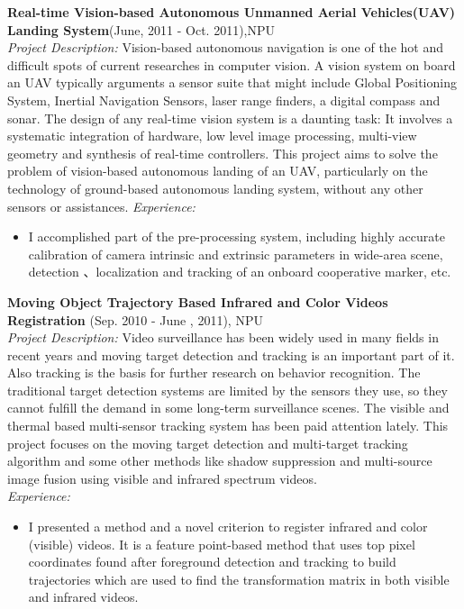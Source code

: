 \documentclass[margin]{res}
\begin{document}
\begin{resume}
                {\bf Real-time Vision-based Autonomous Unmanned Aerial Vehicles(UAV) Landing System}\hfill(June, 2011 - Oct. 2011),NPU\\
                {\sl Project Description: } Vision-based autonomous navigation is one of the hot and difficult spots of current researches in computer vision. A vision system on board an UAV typically arguments a sensor suite that might include Global Positioning System, Inertial Navigation Sensors, laser range finders, a digital compass and sonar. The design of any real-time vision system is a daunting task: It involves a systematic integration of hardware, low level image processing, multi-view geometry and synthesis of real-time controllers. This project aims to solve the problem of vision-based autonomous landing of an UAV, particularly on the technology of ground-based autonomous landing system, without any other sensors or assistances.
                {\sl Experience: }
                \begin{itemize} \itemsep -2pt
                \item I accomplished part of the pre-processing system, including highly accurate calibration of camera intrinsic and extrinsic parameters in wide-area scene, detection 、localization and tracking of an onboard cooperative marker, etc.
                \end{itemize}

                {\bf Moving Object Trajectory Based Infrared and Color Videos Registration} \hfill (Sep. 2010 - June , 2011), NPU\\
                {\sl Project Description: } Video surveillance has been widely used in many fields in recent years and moving target detection and tracking is an important part of it. Also tracking is the basis for further research on behavior recognition. The traditional target detection systems are limited by the sensors they use, so they cannot fulfill the demand in some long-term surveillance scenes. The visible and thermal based multi-sensor tracking system has been paid attention lately. This project focuses on the moving target detection and multi-target tracking algorithm and some other methods like shadow suppression and multi-source image fusion using visible and infrared spectrum videos.\\
                {\sl Experience: }
                \begin{itemize} \itemsep -2pt
                \item I presented a method and a novel criterion to
                register infrared and color (visible) videos. It is a feature point-based
                method that uses top pixel coordinates found after foreground
                detection and tracking to build trajectories which are used to find the transformation
                matrix in both visible and infrared videos.
                \end{itemize}


\end{resume}
\end{document}
